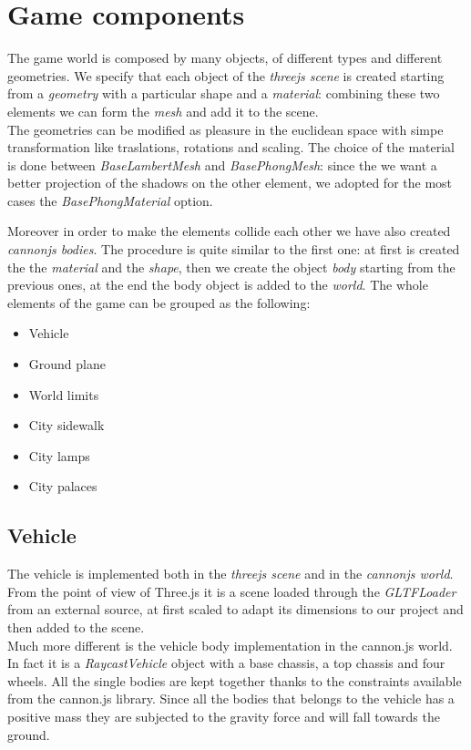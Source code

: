 \documentclass[a4paper, 11pt, titlepage]{report}
\begin{document}
\chapter{Game components}
	\par The game world is composed by many objects, of different types and different geometries. 
	We specify that each object of the \emph{threejs scene} is created starting from a \emph{geometry} with a particular shape and a \emph{material}: combining these two elements we can form the \emph{mesh} and add it to the scene. \\
	The geometries can be modified as pleasure in the euclidean space with simpe transformation like traslations, rotations and scaling. The choice of the material is done between \emph{BaseLambertMesh} and \emph{BasePhongMesh}: since the we want a better projection of the shadows on the other element, we adopted for the most cases the \emph{BasePhongMaterial} option.
	\par Moreover in order to make the elements collide each other we have also created \emph{cannonjs bodies}. The procedure is quite similar to the first one: at first is created the the \emph{material} and the \emph{shape}, then we create the object \emph{body} starting from the previous ones, at the end the body object is added to the \emph{world}.
	The whole elements of the game can be grouped as the following: 
	\begin{itemize}
		\setlength\itemsep{0.25em}
		\item Vehicle
		\item Ground plane
		\item World limits
		\item City sidewalk
		\item City lamps
		\item City palaces
	\end{itemize}  
	\section{Vehicle}
		\par The vehicle is implemented both in the \emph{threejs scene} and in the \emph{cannonjs world}. From the point of view of Three.js it is a scene loaded through the \emph{GLTFLoader} from an external source, at first scaled to adapt its dimensions to our project and then added to the scene. \\
		Much more different is the vehicle body implementation in the cannon.js world. In fact it is a \emph{RaycastVehicle} object with a base chassis, a top chassis and four wheels. All the single bodies are kept together thanks to the constraints available from the cannon.js library. Since all the bodies that belongs to the vehicle has a positive mass they are subjected to the gravity force and will fall towards the ground.
\end{document}
